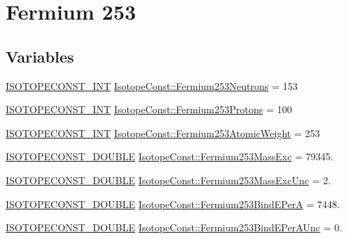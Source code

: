 \hypertarget{group___isotope_const-_fermium-_fm253}{}\section{Fermium 253}
\label{group___isotope_const-_fermium-_fm253}
\subsection*{Variables}
\begin{DoxyCompactItemize}
\item 
\mbox{\hyperlink{group___isotope_const-_macros_ga5f18360b3e99483a35c32d789e62621c}{I\+S\+O\+T\+O\+P\+E\+C\+O\+N\+S\+T\+\_\+\+I\+NT}} \mbox{\hyperlink{group___isotope_const-_fermium-_fm253_ga775999e5e5aea8331c70e6f61e5a26c9}{Isotope\+Const\+::\+Fermium253\+Neutrons}} = 153
\item 
\mbox{\hyperlink{group___isotope_const-_macros_ga5f18360b3e99483a35c32d789e62621c}{I\+S\+O\+T\+O\+P\+E\+C\+O\+N\+S\+T\+\_\+\+I\+NT}} \mbox{\hyperlink{group___isotope_const-_fermium-_fm253_gaffb24839d14b796b6fb7da4e991ece44}{Isotope\+Const\+::\+Fermium253\+Protons}} = 100
\item 
\mbox{\hyperlink{group___isotope_const-_macros_ga5f18360b3e99483a35c32d789e62621c}{I\+S\+O\+T\+O\+P\+E\+C\+O\+N\+S\+T\+\_\+\+I\+NT}} \mbox{\hyperlink{group___isotope_const-_fermium-_fm253_ga6766174f7ad0b8c51c5e8bbc10289626}{Isotope\+Const\+::\+Fermium253\+Atomic\+Weight}} = 253
\item 
\mbox{\hyperlink{group___isotope_const-_macros_ga8f45a7272ce02c0b4c65c44636ed719a}{I\+S\+O\+T\+O\+P\+E\+C\+O\+N\+S\+T\+\_\+\+D\+O\+U\+B\+LE}} \mbox{\hyperlink{group___isotope_const-_fermium-_fm253_ga7cf380e53ac85fb6304d194c237bcee3}{Isotope\+Const\+::\+Fermium253\+Mass\+Exc}} = 79345.
\item 
\mbox{\hyperlink{group___isotope_const-_macros_ga8f45a7272ce02c0b4c65c44636ed719a}{I\+S\+O\+T\+O\+P\+E\+C\+O\+N\+S\+T\+\_\+\+D\+O\+U\+B\+LE}} \mbox{\hyperlink{group___isotope_const-_fermium-_fm253_gab0ae2eb7d6e791218f9f49b42839aee3}{Isotope\+Const\+::\+Fermium253\+Mass\+Exc\+Unc}} = 2.
\item 
\mbox{\hyperlink{group___isotope_const-_macros_ga8f45a7272ce02c0b4c65c44636ed719a}{I\+S\+O\+T\+O\+P\+E\+C\+O\+N\+S\+T\+\_\+\+D\+O\+U\+B\+LE}} \mbox{\hyperlink{group___isotope_const-_fermium-_fm253_gacef604b154b35c203f6ba2bc577a975e}{Isotope\+Const\+::\+Fermium253\+Bind\+E\+PerA}} = 7448.
\item 
\mbox{\hyperlink{group___isotope_const-_macros_ga8f45a7272ce02c0b4c65c44636ed719a}{I\+S\+O\+T\+O\+P\+E\+C\+O\+N\+S\+T\+\_\+\+D\+O\+U\+B\+LE}} \mbox{\hyperlink{group___isotope_const-_fermium-_fm253_ga8e3e97225f18df7dbd4ea5fbf63e5937}{Isotope\+Const\+::\+Fermium253\+Bind\+E\+Per\+A\+Unc}} = 0.

\end{DoxyCompactItemize}
